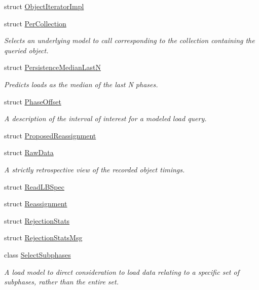 \begin{DoxyCompactItemize}
struct \hyperlink{structvt_1_1vrt_1_1collection_1_1balance_1_1_object_iterator_impl}{Object\+Iterator\+Impl}
\item 
struct \hyperlink{structvt_1_1vrt_1_1collection_1_1balance_1_1_per_collection}{Per\+Collection}
\begin{DoxyCompactList}\small\item\em Selects an underlying model to call corresponding to the collection containing the queried object. \end{DoxyCompactList}\item 
struct \hyperlink{structvt_1_1vrt_1_1collection_1_1balance_1_1_persistence_median_last_n}{Persistence\+Median\+LastN}
\begin{DoxyCompactList}\small\item\em Predicts loads as the median of the last N phases. \end{DoxyCompactList}\item 
struct \hyperlink{structvt_1_1vrt_1_1collection_1_1balance_1_1_phase_offset}{Phase\+Offset}
\begin{DoxyCompactList}\small\item\em A description of the interval of interest for a modeled load query. \end{DoxyCompactList}\item 
struct \hyperlink{structvt_1_1vrt_1_1collection_1_1balance_1_1_proposed_reassignment}{Proposed\+Reassignment}
\item 
struct \hyperlink{structvt_1_1vrt_1_1collection_1_1balance_1_1_raw_data}{Raw\+Data}
\begin{DoxyCompactList}\small\item\em A strictly retrospective view of the recorded object timings. \end{DoxyCompactList}\item 
struct \hyperlink{structvt_1_1vrt_1_1collection_1_1balance_1_1_read_l_b_spec}{Read\+L\+B\+Spec}
\item 
struct \hyperlink{structvt_1_1vrt_1_1collection_1_1balance_1_1_reassignment}{Reassignment}
\item 
struct \hyperlink{structvt_1_1vrt_1_1collection_1_1balance_1_1_rejection_stats}{Rejection\+Stats}
\item 
struct \hyperlink{structvt_1_1vrt_1_1collection_1_1balance_1_1_rejection_stats_msg}{Rejection\+Stats\+Msg}
\item 
class \hyperlink{classvt_1_1vrt_1_1collection_1_1balance_1_1_select_subphases}{Select\+Subphases}
\begin{DoxyCompactList}\small\item\em A load model to direct consideration to load data relating to a specific set of subphases, rather than the entire set. \end{DoxyCompactList}\item 

\end{DoxyCompactItemize}
